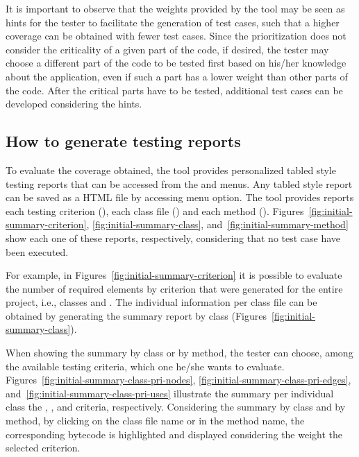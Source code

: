 



It is important to observe that the weights provided by the tool
may be seen as hints for the tester to facilitate the generation
of test cases, such that a higher coverage can be obtained with
fewer test cases. Since the prioritization does not consider the
criticality of a given part of the code, if desired, the tester
may choose a different part of the code to be tested first based
on his/her knowledge about the application, even if such a part
has a lower weight than other parts of the code. After the
critical parts have to be tested, additional test cases can be
developed considering the hints.

\subsection{How to generate testing reports}

To evaluate the coverage obtained, the tool provides personalized
tabled style testing reports that can be accessed from the
 and  menus. Any tabled style report can
be saved as a HTML file by accessing  menu option. The tool provides reports \wrt each
testing criterion (), \wrt
each class file () and \wrt
each method ().
Figures~\ref{fig:initial-summary-criterion},
\ref{fig:initial-summary-class},
and~\ref{fig:initial-summary-method} show each one of these
reports, respectively, considering that no test case have been
executed.



For example, in Figures~\ref{fig:initial-summary-criterion} it is
possible to evaluate the number of required elements by criterion
that were generated for the entire project, i.e., classes
 and . The individual information
per class file can be obtained by generating the summary report by
class (Figures~\ref{fig:initial-summary-class}).

When showing the summary by class or by method, the tester can
choose, among the available testing criteria, which one he/she
wants to evaluate.
Figures~\ref{fig:initial-summary-class-pri-nodes},
\ref{fig:initial-summary-class-pri-edges},
and~\ref{fig:initial-summary-class-pri-uses} illustrate the
summary per individual class \wrt the ,
, and  criteria, respectively.
Considering the summary by class and by method, by clicking on the
class file name or in the method name, the corresponding bytecode
is highlighted and displayed considering the weight \wrt the
selected criterion.

